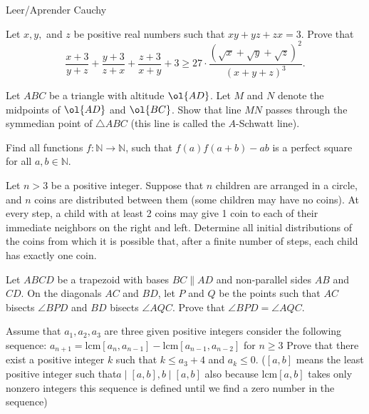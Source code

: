 \documentclass[11pt]{scrartcl}
\begin{document}
\begin{problem}
Leer/Aprender Cauchy
\end{problem}
\begin{problem}
Let $x, y,$ and $z$ be positive real numbers such that $xy + yz + zx = 3$. Prove that
$$\frac{x + 3}{y + z} + \frac{y + 3}{z + x} + \frac{z + 3}{x + y} + 3 \ge 27 \cdot \frac{(\sqrt{x} + \sqrt{y} + \sqrt{z})^2}{(x + y + z)^3}.$$
\end{problem}
\begin{problem}
  Let $ABC$ be a triangle with altitude $\ol{AD}$.
  Let $M$ and $N$ denote the midpoints of $\ol{AD}$ and $\ol{BC}$.
  Show that line $MN$ passes through
  the symmedian point of $\triangle ABC$
  (this line is called the $A$-Schwatt line).
\end{problem}
\begin{problem}
	Find all functions $f:\mathbb{N} \rightarrow \mathbb{N}$, such that $f(a)f(a+b)-ab$ is a perfect square for all $a, b \in \mathbb{N}$.
\end{problem}
\begin{problem}[IMO SL 2022/C4]
Let $n > 3$ be a positive integer. Suppose that $n$ children are arranged in a circle, and $n$ coins are distributed between them (some children may have no coins). At every step, a child with at least 2 coins may give 1 coin to each of their immediate neighbors on the right and left. Determine all initial distributions of the coins from which it is possible that, after a finite number of steps, each child has exactly one coin.  
\end{problem}
\begin{problem}
Let $ABCD$ be a trapezoid with bases $BC \parallel AD$ and non-parallel sides $AB$ and $CD$. On the diagonals $AC$ and $BD$, let $P$ and $Q$ be the points such that $AC$ bisects $\angle BPD$ and $BD$ bisects $\angle AQC$. Prove that $\angle BPD = \angle AQC$.
\end{problem}
\begin{problem}
Assume that $a_1, a_2, a_3$ are three given positive integers consider the following sequence:
$a_{n+1}=\text{lcm}[a_n, a_{n-1}]-\text{lcm}[a_{n-1}, a_{n-2}]$ for $n\ge 3$
Prove that there exist a positive integer $k$ such that $k\le a_3+4$ and $a_k\le 0$.
($[a, b]$ means the least positive integer such that$ a\mid[a,b], b\mid[a, b]$ also because $\text{lcm}[a, b]$ takes only nonzero integers this sequence is defined until we find a zero number in the sequence)
\end{problem}
\end{document}
